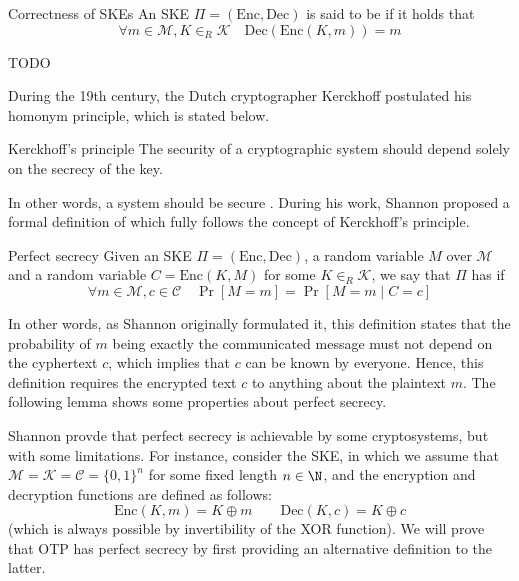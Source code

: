 \documentclass[a4paper, 12pt]{report}
\begin{document}
\begin{frameddefn}{Correctness of SKEs}
	An SKE $\Pi = (\mbox{Enc}, \mbox{Dec})$ is said to be  if it holds that $$\forall m \in \mathcal M, K \in_R \mathcal K \quad \mbox{Dec}(\mbox{Enc}(K, m)) = m$$
\end{frameddefn}

TODO 

During the 19th century, the Dutch cryptographer Kerckhoff postulated his homonym principle, which is stated below.

\begin{framedprinc}{Kerckhoff's principle}
	The security of a cryptographic system should depend solely on the secrecy of the key.
\end{framedprinc}

In other words, a system should be secure . During his work, Shannon proposed a formal definition of  which fully follows the concept of Kerckhoff's principle.

\begin{frameddefn}{Perfect secrecy}
	Given an SKE $\Pi = (\mbox{Enc}, \mbox{Dec})$, a random variable $M$ over $\mathcal M$ and a random variable $C = \mbox{Enc}(K, M)$ for some $K \in_R \mathcal K$, we say that $\Pi$ has  if $$\forall m \in \mathcal M, c \in \mathcal C \quad \Pr[M = m] = \Pr[M = m \mid C = c]$$
\end{frameddefn}

In other words, as Shannon originally formulated it, this definition states that the probability of $m$ being exactly the communicated message must not depend on the cyphertext $c$, which implies that $c$ can be known by everyone. Hence, this definition requires the encrypted text $c$ to  anything about the plaintext $m$. The following lemma shows some properties about perfect secrecy.

Shannon provde that perfect secrecy is achievable by some cryptosystems, but with some limitations. For instance, consider the  SKE, in which we assume that $\mathcal M = \mathcal K = \mathcal C = \{0, 1\}^n$ for some fixed length $n \in \N$, and the encryption and decryption functions are defined as follows: $$\mbox{Enc}(K, m) = K \oplus m \quad \quad \mbox{Dec}(K, c) = K \oplus c$$ (which is always possible by invertibility of the XOR function). We will prove that OTP has perfect secrecy by first providing an alternative definition to the latter.
\end{document}
